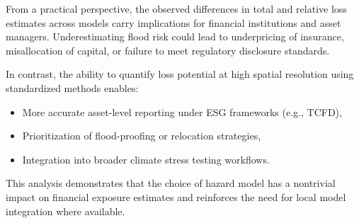 From a practical perspective, the observed differences in total and relative loss estimates across models carry implications for financial institutions and asset managers. Underestimating flood risk could lead to underpricing of insurance, misallocation of capital, or failure to meet regulatory disclosure standards.

In contrast, the ability to quantify loss potential at high spatial resolution using standardized methods enables:
\begin{itemize}
	\item More accurate asset-level reporting under ESG frameworks (e.g., TCFD),
	\item Prioritization of flood-proofing or relocation strategies,
	\item Integration into broader climate stress testing workflows.
\end{itemize}

This analysis demonstrates that the choice of hazard model has a nontrivial impact on financial exposure estimates and reinforces the need for local model integration where available.

